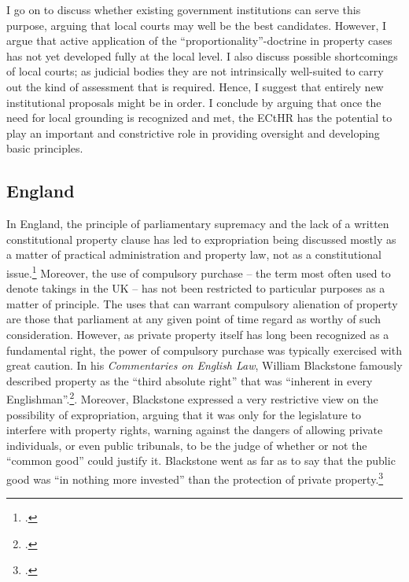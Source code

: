 I go on to discuss whether existing government institutions can serve this purpose, arguing that local courts may well be the best candidates. However, I argue that active application of the ``proportionality''-doctrine in property cases has not yet developed fully at the local level. I also discuss possible shortcomings of local courts; as judicial bodies they are not intrinsically well-suited to carry out the kind of assessment that is required. Hence, I suggest that entirely new institutional proposals might be in order. I conclude by arguing that once the need for local grounding is recognized and met, the ECtHR has the potential to play an important and constrictive role in providing oversight and developing basic principles.

\subsection{England}

In England, the principle of parliamentary supremacy and the lack of a written constitutional property clause has led to expropriation being discussed mostly as a matter of practical administration and property law, not as a constitutional issue.\footcite{taggart98} Moreover, the use of compulsory purchase -- the term most often used to denote takings in the UK -- has not been restricted to particular purposes as a matter of principle. The uses that can warrant compulsory alienation of property are those that parliament at any given point of time regard as worthy of such consideration. However, as private property itself has long been recognized as a fundamental right, the power of compulsory purchase was typically exercised with great caution. In his {\it Commentaries on English Law}, William Blackstone famously described property as the ``third absolute right'' that was ``inherent in every Englishman''.\footcite[134-135]{blackstone79}.  Moreover, Blackstone expressed a very restrictive view on the possibility of expropriation, arguing that it was only for the legislature to interfere with property rights, warning against the dangers of allowing private individuals, or even public tribunals, to be the judge of whether or not the ``common good'' could justify it. Blackstone went as far as to say that the public good was ``in nothing more invested'' than the protection of private property.\footcite[134-135]{blackstone79}

